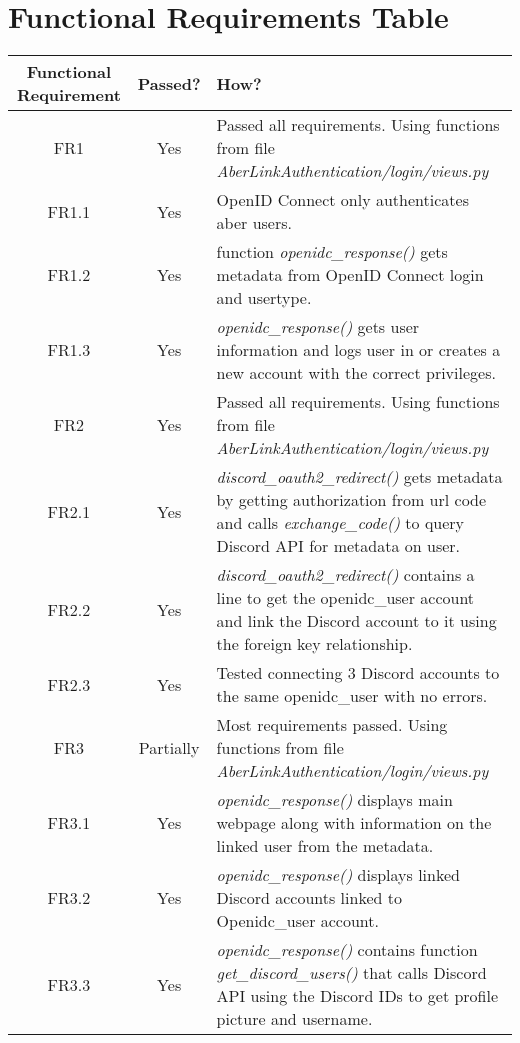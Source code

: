 \chapter{Functional Requirements Table}

\begin{longtable}{| c | c | p{10cm} |}
\hline
Functional Requirement & Passed? & How? \\
\hline
FR1 & \color{ForestGreen}Yes & Passed all requirements. Using functions from file \textit{AberLinkAuthentication/login/views.py}\\
\hline
FR1.1 & \color{ForestGreen}Yes &  OpenID Connect only authenticates aber users.\\
\hline
FR1.2 & \color{ForestGreen}Yes & function \textit{openidc\_response()} gets metadata from OpenID Connect login and usertype.\\
\hline
FR1.3 & \color{ForestGreen}Yes & \textit{openidc\_response()} gets user information and logs user in or creates a new account with the correct privileges.\\
\hline
FR2 & \color{ForestGreen}Yes & Passed all requirements. Using functions from file \textit{AberLinkAuthentication/login/views.py}\\
\hline
FR2.1 & \color{ForestGreen}Yes & \textit{discord\_oauth2\_redirect()} gets metadata by getting authorization from url code and calls \textit{exchange\_code()} to query Discord API for metadata on user.\\
\hline
FR2.2 & \color{ForestGreen}Yes & \textit{discord\_oauth2\_redirect()} contains a line to get the openidc\_user account and link the Discord account to it using the foreign key relationship.\\
\hline
FR2.3 & \color{ForestGreen}Yes & Tested connecting 3 Discord accounts to the same openidc\_user with no errors.\\
\hline
FR3 & \color{orange}Partially & Most requirements passed. Using functions from file \textit{AberLinkAuthentication/login/views.py}\\
\hline
FR3.1 & \color{ForestGreen}Yes & \textit{openidc\_response()} displays main webpage along with information on the linked user from the metadata.\\
\hline
FR3.2 & \color{ForestGreen}Yes & \textit{openidc\_response()}  displays linked Discord accounts linked to Openidc\_user account.\\
\hline
FR3.3 & \color{ForestGreen}Yes & \textit{openidc\_response()} contains function \textit{get\_discord\_users()} that calls Discord API using the Discord IDs to get profile picture and username.\\

\end{longtable}
